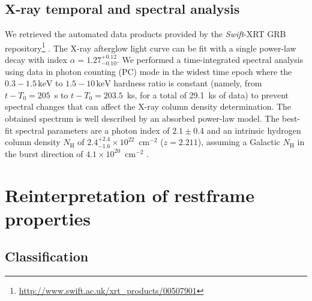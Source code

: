 \documentclass{aa}    %
\begin{document}

\subsection{X-ray temporal and spectral analysis}

We retrieved the automated data products provided by the \textit{Swift}-XRT GRB
repository\footnote{\url{http://www.swift.ac.uk/xrt\_products/00507901}}
\citep{Evans2009}. The X-ray afterglow light curve can be fit with a single power-law decay with
index $\alpha=1.27_{-0.10}^{+0.12}$. We performed a time-integrated spectral
analysis using data in photon counting (PC) mode in the widest time epoch where
the $0.3-1.5\,\mathrm{keV}$ to $1.5-10\,\mathrm{keV}$ hardness ratio is constant
(namely, from $t-T_0 = 205$~s to $t-T_0 = 203.5$~ks, for a total of 29.1~ks of
data) to prevent spectral changes that can affect the X-ray column density
determination. The obtained spectrum is well described by an absorbed power-law
model. The best-fit spectral parameters are a photon index of $2.1 \pm 0.4$ and
an intrinsic hydrogen column density $N_{\mathrm{H}}$ of $2.4_{-1.6}^{+2.4}
\times 10^{22}$~cm$^{-2}$ ($z=2.211$), assuming a Galactic $N_{\mathrm{H}}$ in
the burst direction of $4.1 \times 10^{20}$~cm$^{-2}$ \citep{Willingale2013}.




\section{Reinterpretation of restframe properties}


\subsection{Classification}
\end{document}
